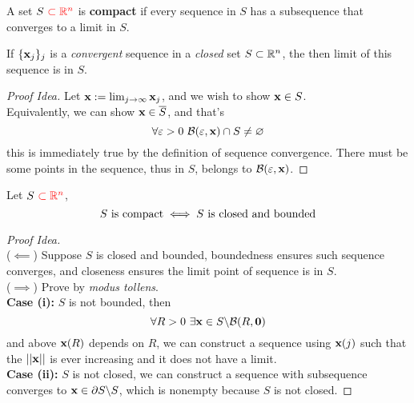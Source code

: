 \documentclass[11pt]{article}
\newcommand{\vex}[0]{\ve{x}}
\begin{document}
				\begin{definition}
					A set $S\ \textcolor{red}{\subset \mathbb{R}^n}$ is \textbf{compact} if every sequence in $S$ has a subsequence that converges to a limit in $S$.
				\end{definition}
				
				\begin{proposition}
					If $\{\vex_j\}_j$ is a \emph{convergent} sequence in a \emph{closed} set $S \subset \mathbb{R}^n$, the then limit of this sequence is in $S$.
					\begin{proof}[Proof Idea]
						Let $\vex := \lim_{j \to \infty} \vex_j$, and we wish to show $\vex \in S$. \\
						Equivalently, we can show $\vex \in \overline{S}$, and that's 
						\begin{equation}
							\forall \varepsilon >0\ \mathcal{{B}}(\varepsilon, \textbf{x}) \cap S \neq \varnothing
						\end{equation}
						this is immediately true by the definition of sequence convergence. There must be some points in the sequence, thus in $S$, belongs to $\mathcal{{B}}(\varepsilon, \textbf{x})$.
					\end{proof}
				\end{proposition}
			
				\begin{theorem} Let $S\ \textcolor{red}{\subset \mathbb{R}^n}$,
					\begin{equation}
						S \text{{ is compact}} \iff S \text{{ is closed and bounded}}
					\end{equation}
					\begin{proof}[Proof Idea] \quad \\
						($\impliedby$) Suppose $S$ is closed and bounded, boundedness ensures such sequence converges, and closeness ensures the limit point of sequence is in $S$. \\
						($\implies$) Prove by \emph{modus tollens}. \\
						\textbf{Case (i): }$S$ is not bounded, then
						\begin{equation}
							\forall R > 0\ \exists \vex \in S \backslash \mc{B}(R,\ve{0})
						\end{equation}
						and above $\vex(R)$ depends on $R$, we can construct a sequence using $\vex(j)$ such that the $\norm{\vex}$ is ever increasing and it does not have a limit. \\
						\textbf{Case (ii):} $S$ is not closed, we can construct a sequence with subsequence converges to $\vex \in \partial S \backslash S$, which is nonempty because $S$ is not closed.
					\end{proof}
				\end{theorem}
			
\end{document}
